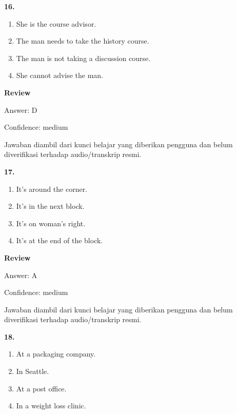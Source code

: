 \documentclass[12pt]{article}
\begin{document}
\noindent\textbf{16.}
\begin{enumerate}[label=(\Alph*),leftmargin=*,itemsep=0.2em]
\item She is the course advisor.
\item The man needs to take the history course.
\item The man is not taking a discussion course.
\item She cannot advise the man.
\end{enumerate}
\par
\begingroup
\setlength{\parskip}{0pt}
\setlength{\parindent}{0pt}
\textbf{Review}\par
Answer: D\par
Confidence: medium\par
Jawaban diambil dari kunci belajar yang diberikan pengguna dan belum diverifikasi terhadap audio/transkrip resmi.\par
\endgroup
\par
\vspace{0.25\baselineskip}
\noindent\textbf{17.}
\begin{enumerate}[label=(\Alph*),leftmargin=*,itemsep=0.2em]
\item It's around the corner.
\item It's in the next block.
\item It's on woman's right.
\item It's at the end of the block.
\end{enumerate}
\par
\begingroup
\setlength{\parskip}{0pt}
\setlength{\parindent}{0pt}
\textbf{Review}\par
Answer: A\par
Confidence: medium\par
Jawaban diambil dari kunci belajar yang diberikan pengguna dan belum diverifikasi terhadap audio/transkrip resmi.\par
\endgroup
\par
\vspace{0.25\baselineskip}
\noindent\textbf{18.}
\begin{enumerate}[label=(\Alph*),leftmargin=*,itemsep=0.2em]
\item At a packaging company.
\item In Seattle.
\item At a post office.
\item In a weight loss clinic.
\end{enumerate}
\par
\begingroup
\end{document}
